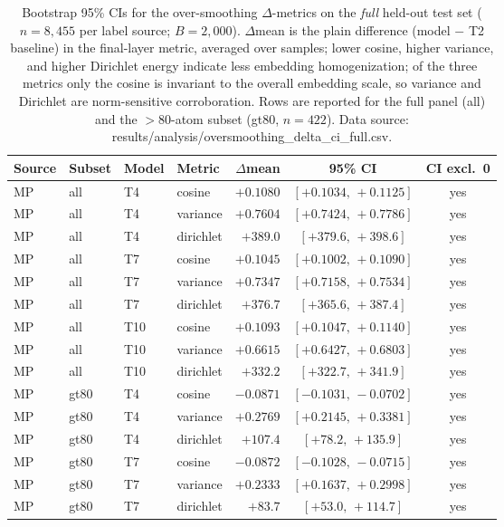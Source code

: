 \documentclass[a4paper,10pt]{article}
\begin{document}
\begin{table}[htbp]
\centering
\caption{Bootstrap 95\% CIs for the over-smoothing \(\Delta\)-metrics on the \emph{full} held-out test set (\(n=8{,}455\) per label source; \(B=2{,}000\)). \(\Delta\)mean is the plain difference (model \(-\) T2 baseline) in the final-layer metric, averaged over samples; lower cosine, higher variance, and higher Dirichlet energy indicate less embedding homogenization; of the three metrics only the cosine is invariant to the overall embedding scale, so variance and Dirichlet are norm-sensitive corroboration. Rows are reported for the full panel (all) and the \(>80\)-atom subset (gt80, \(n=422\)). Data source: \textnormal{results/analysis/oversmoothing\_delta\_ci\_full.csv}.}
\label{tab:oversmoothing-ci}
\scriptsize
\begin{tabular}{l l l l r c c}
\toprule
Source & Subset & Model & Metric & \(\Delta\)mean & 95\% CI & CI excl.\ 0 \\
\midrule
MP & all & T4 & cosine & \(+0.1080\) & \([+0.1034,\,+0.1125]\) & yes \\
MP & all & T4 & variance & \(+0.7604\) & \([+0.7424,\,+0.7786]\) & yes \\
MP & all & T4 & dirichlet & \(+389.0\) & \([+379.6,\,+398.6]\) & yes \\
MP & all & T7 & cosine & \(+0.1045\) & \([+0.1002,\,+0.1090]\) & yes \\
MP & all & T7 & variance & \(+0.7347\) & \([+0.7158,\,+0.7534]\) & yes \\
MP & all & T7 & dirichlet & \(+376.7\) & \([+365.6,\,+387.4]\) & yes \\
MP & all & T10 & cosine & \(+0.1093\) & \([+0.1047,\,+0.1140]\) & yes \\
MP & all & T10 & variance & \(+0.6615\) & \([+0.6427,\,+0.6803]\) & yes \\
MP & all & T10 & dirichlet & \(+332.2\) & \([+322.7,\,+341.9]\) & yes \\
MP & gt80 & T4 & cosine & \(-0.0871\) & \([-0.1031,\,-0.0702]\) & yes \\
MP & gt80 & T4 & variance & \(+0.2769\) & \([+0.2145,\,+0.3381]\) & yes \\
MP & gt80 & T4 & dirichlet & \(+107.4\) & \([+78.2,\,+135.9]\) & yes \\
MP & gt80 & T7 & cosine & \(-0.0872\) & \([-0.1028,\,-0.0715]\) & yes \\
MP & gt80 & T7 & variance & \(+0.2333\) & \([+0.1637,\,+0.2998]\) & yes \\
MP & gt80 & T7 & dirichlet & \(+83.7\) & \([+53.0,\,+114.7]\) & yes \\

\end{tabular}
\end{table}
\end{document}
